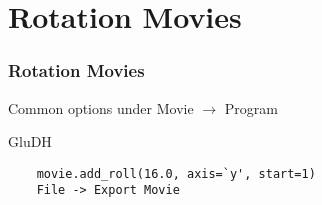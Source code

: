 \documentclass[aspectratio=169]{beamer}
\begin{document}
\section{Rotation Movies}
\begin{frame}[fragile]
    \frametitle{Rotation Movies}

    Common options under Movie $\rightarrow$ Program 

    \vspace*{1.5cm}
    GluDH

    \begin{lstlisting}
    movie.add_roll(16.0, axis=`y', start=1)
    File -> Export Movie
    \end{lstlisting}

    \href{https://youtu.be/eaRJjZ0OLRs}{\color{blue}{https://youtu.be/eaRJjZ0OLRs}}
\end{frame}
\end{document}
